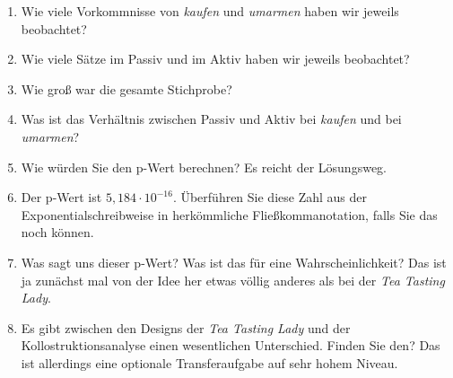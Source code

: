 \begin{enumerate}\Lf
  \item Wie viele Vorkommnisse von \textit{kaufen} und \textit{umarmen} haben wir jeweils beobachtet?
  \item Wie viele Sätze im Passiv und im Aktiv haben wir jeweils beobachtet?
  \item Wie groß war die gesamte Stichprobe?
  \item Was ist das Verhältnis zwischen Passiv und Aktiv bei \textit{kaufen} und bei \textit{umarmen}?
  \item Wie würden Sie den p-Wert berechnen? Es reicht der Lösungsweg.
  \item Der p-Wert ist $5,184\cdot 10^{-16}$. Überführen Sie diese Zahl aus der Exponentialschreibweise in herkömmliche Fließkommanotation, falls Sie das noch können.
  \item Was sagt uns dieser p-Wert? Was ist das für eine Wahrscheinlichkeit? Das ist ja zunächst mal von der Idee her etwas völlig anderes als bei der \textit{Tea Tasting Lady}.
  \item Es gibt zwischen den Designs der \textit{Tea Tasting Lady} und der Kollostruktionsanalyse einen wesentlichen Unterschied. Finden Sie den? Das ist allerdings eine optionale Transferaufgabe auf sehr hohem Niveau.
\end{enumerate}

